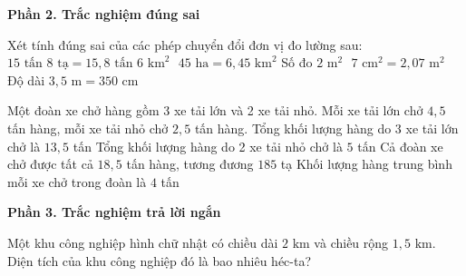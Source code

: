 \textbf{Phần 2. Trắc nghiệm đúng sai}

\begin{ex} %
Xét tính đúng sai của các phép chuyển đổi đơn vị đo lường sau:
\choiceTF
{\True $15\text{ tấn }8\text{ tạ} = 15{,}8\text{ tấn}$}
{\True $6\text{ km}^2\text{ }45\text{ ha} = 6{,}45\text{ km}^2$}
{Số đo $2\text{ m}^2\text{ }7\text{ cm}^2 = 2{,}07\text{ m}^2$}
{\True Độ dài $3{,}5\text{ m} = 350\text{ cm}$}
\end{ex}

\begin{ex} %
Một đoàn xe chở hàng gồm 3 xe tải lớn và 2 xe tải nhỏ. Mỗi xe tải lớn chở $4{,}5$ tấn hàng, mỗi xe tải nhỏ chở $2{,}5$ tấn hàng.
\choiceTF
{\True Tổng khối lượng hàng do 3 xe tải lớn chở là $13{,}5$ tấn}
{\True Tổng khối lượng hàng do 2 xe tải nhỏ chở là $5$ tấn}
{\True Cả đoàn xe chở được tất cả $18{,}5$ tấn hàng, tương đương $185$ tạ}
{Khối lượng hàng trung bình mỗi xe chở trong đoàn là $4$ tấn}
\end{ex}

\textbf{Phần 3. Trắc nghiệm trả lời ngắn}

\begin{ex} %
Một khu công nghiệp hình chữ nhật có chiều dài $2\text{ km}$ và chiều rộng $1{,}5\text{ km}$. Diện tích của khu công nghiệp đó là bao nhiêu héc-ta?
\end{ex}

